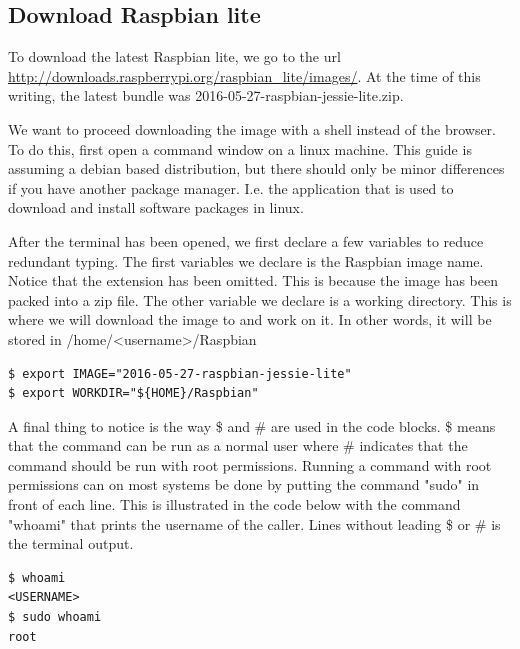 \subsection{Download Raspbian lite}

To download the latest Raspbian lite, we go to the url
\url{http://downloads.raspberrypi.org/raspbian_lite/images/}.
At the time of this writing, the latest bundle was
2016-05-27-raspbian-jessie-lite.zip.

We want to proceed downloading the image with a shell instead of the browser.
To do this, first open a command window on a linux machine. This guide is
assuming a debian based distribution, but there should only be minor differences
if you have another package manager. I.e. the application that is used to
download and install software packages in linux.

After the terminal has been opened, we first declare a few variables to reduce
redundant typing. The first variables we declare is the Raspbian image name.
Notice that the extension has been omitted. This is because the image has been
packed into a zip file.
The other variable we declare is a working directory. This is where we will
download the image to and work on it. In other words, it will be stored in
/home/<username>/Raspbian


\begin{lstlisting}[]
$ export IMAGE="2016-05-27-raspbian-jessie-lite"
$ export WORKDIR="${HOME}/Raspbian"
\end{lstlisting}
\FloatBarrier

A final thing to notice is the way \$ and \# are used in the code blocks. \$
means that the command can be run as a normal user where \# indicates that the
command should be run with root permissions.
Running a command with root permissions can on most systems be done by putting
the command "sudo" in front of each line. This is illustrated in the code below
with the command "whoami" that prints the username of the caller. Lines without
leading \$ or \# is the terminal output.

\begin{lstlisting}[]
$ whoami
<USERNAME>
$ sudo whoami
root
\end{lstlisting}
\FloatBarrier

